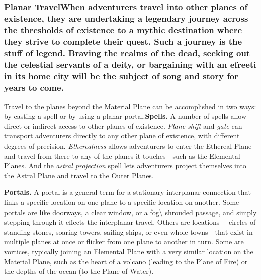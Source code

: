 \documentclass[
]{article}
\begin{document}
\hypertarget{planar-travelwhen-adventurers-travel-into-other-planes-of-existence-they-are-undertaking-a-legendary-journey-across-the-thresholds-of-existence-to-a-mythic-destination-where-they-strive-to-complete-their-quest-such-a-journey-is-the-stuff-of-legend-braving-the-realms-of-the-dead-seeking-out-the-celestial-servants-of-a-deity-or-bargaining-with-an-efreeti-in-its-home-city-will-be-the-subject-of-song-and-story-for-years-to-come}{%
\subsubsection{Planar TravelWhen adventurers travel into other planes of
existence, they are undertaking a legendary journey across the
thresholds of existence to a mythic destination where they strive to
complete their quest. Such a journey is the stuff of legend. Braving the
realms of the dead, seeking out the celestial servants of a deity, or
bargaining with an efreeti in its home city will be the subject of song
and story for years to
come.}\label{planar-travelwhen-adventurers-travel-into-other-planes-of-existence-they-are-undertaking-a-legendary-journey-across-the-thresholds-of-existence-to-a-mythic-destination-where-they-strive-to-complete-their-quest-such-a-journey-is-the-stuff-of-legend-braving-the-realms-of-the-dead-seeking-out-the-celestial-servants-of-a-deity-or-bargaining-with-an-efreeti-in-its-home-city-will-be-the-subject-of-song-and-story-for-years-to-come}}

Travel to the planes beyond the Material Plane can be accomplished in
two ways: by casting a spell or by using a planar
portal.\textbf{Spells.} A number of spells allow direct or indirect
access to other planes of existence. \emph{Plane shift} and \emph{gate}
can transport adventurers directly to any other plane of existence, with
different degrees of precision. \emph{Etherealness} allows adventurers
to enter the Ethereal Plane and travel from there to any of the planes
it touches---such as the Elemental Planes. And the \emph{astral
projection} spell lets adventurers project themselves into the Astral
Plane and travel to the Outer Planes.

\textbf{Portals.} A portal is a general term for a stationary
interplanar connection that links a specific location on one plane to a
specific location on another. Some portals are like doorways, a clear
window, or a fog\textbackslash{} shrouded passage, and simply stepping
through it effects the interplanar travel. Others are locations---
circles of standing stones, soaring towers, sailing ships, or even whole
towns---that exist in multiple planes at once or flicker from one plane
to another in turn. Some are vortices, typically joining an Elemental
Plane with a very similar location on the Material Plane, such as the
heart of a volcano (leading to the Plane of Fire) or the depths of the
ocean (to the Plane of Water).
\end{document}
